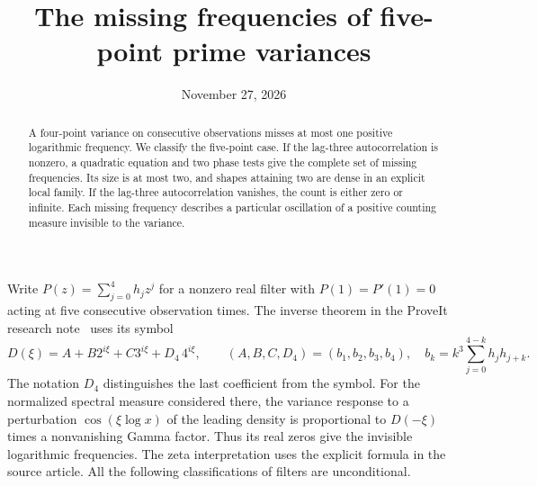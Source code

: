 \documentclass[11pt,letterpaper]{article}
\title{The missing frequencies of five-point prime variances}
\author{}
\date{November 27, 2026}
\begin{document}
\maketitle
\begin{abstract}
A four-point variance on consecutive observations misses at most one positive logarithmic frequency. We classify the five-point case. If the lag-three autocorrelation is nonzero, a quadratic equation and two phase tests give the complete set of missing frequencies. Its size is at most two, and shapes attaining two are dense in an explicit local family. If the lag-three autocorrelation vanishes, the count is either zero or infinite. Each missing frequency describes a particular oscillation of a positive counting measure invisible to the variance.
\end{abstract}

Write $P(z)=\sum_{j=0}^4h_jz^j$ for a nonzero real filter with $P(1)=P'(1)=0$ acting at five consecutive observation times. The inverse theorem in the ProveIt research note~\cite{prior} uses its symbol
\[
 D(\xi)=A+B2^{i\xi}+C3^{i\xi}+D_4\,4^{i\xi},\qquad
 (A,B,C,D_4)=(b_1,b_2,b_3,b_4),\quad b_k=k^3\sum_{j=0}^{4-k}h_jh_{j+k}.
\]
The notation $D_4$ distinguishes the last coefficient from the symbol. For the normalized spectral measure considered there, the variance response to a perturbation $\cos(\xi\log x)$ of the leading density is proportional to $D(-\xi)$ times a nonvanishing Gamma factor. Thus its real zeros give the invisible logarithmic frequencies. The zeta interpretation uses the explicit formula in the source article. All the following classifications of filters are unconditional.
\end{document}
